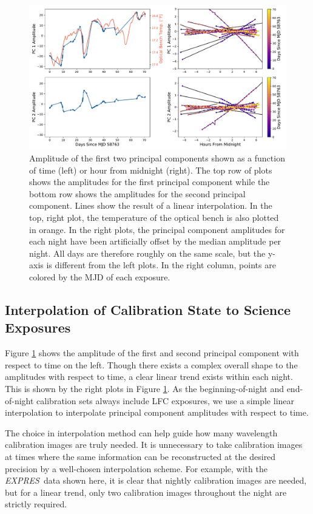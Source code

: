 \documentclass[twocolumn,table,xcolor,trackchanges]{aastex63}
\newcommand{\project}[1]{\textsl{#1}}
\newcommand{\acronym}[1]{{\small{#1}}}
\newcommand{\expres}{\project{\acronym{EXPRES}}}
\begin{document}
\label{sec:choice_avt}
\begin{figure}[t]
\centering
\includegraphics[width=\textwidth]{Figures/pcAs_byDay.pdf}
\caption{Amplitude of the first two principal components shown as a function of time (left) or hour from midnight (right).  The top row of plots shows the amplitudes for the first principal component while the bottom row shows the amplitudes for the second principal component.  Lines show the result of a linear interpolation.  In the top, right plot, the temperature of the optical bench is also plotted in orange.  In the right plots, the principal component amplitudes for each night have been artificially offset by the median amplitude per night.  All days are therefore roughly on the same scale, but the y-axis is different from the left plots.  In the right column, points are colored by the MJD of each exposure.}
\label{fig:nightlyVariation}
\end{figure} 

\subsection{Interpolation of Calibration State to Science Exposures}
Figure \ref{fig:nightlyVariation} shows the amplitude of the first and second principal component with respect to time on the left.  Though there exists a complex overall shape to the amplitudes with respect to time, a clear linear trend exists within each night.  This is shown by the right plots in Figure  \ref{fig:nightlyVariation}.  As the beginning-of-night and end-of-night calibration sets always include LFC exposures, we use a simple linear interpolation to interpolate principal component amplitudes with respect to time.

The choice in interpolation method can help guide how many wavelength calibration images are truly needed.  It is unnecessary to take calibration images at times where the same information can be reconstructed at the desired precision by a well-chosen interpolation scheme.  For example, with the \expres\ data shown here, it is clear that nightly calibration images are needed, but for a linear trend, only two calibration images throughout the night are strictly required.
\end{document}
